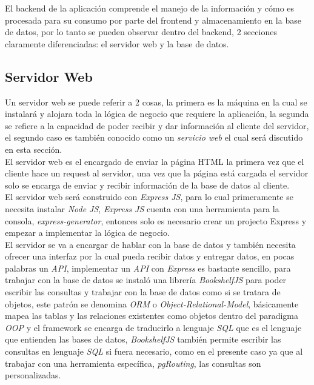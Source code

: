 


El backend de la aplicación comprende el manejo de la información y cómo es procesada para su consumo por parte del frontend y almacenamiento en la base de datos, por lo tanto se pueden observar dentro del backend, 2 secciones claramente diferenciadas: el servidor web y la base de datos.\\




\subsection{Servidor Web}
\label{sub:servidor_web}

Un servidor web se puede referir a 2 cosas, la primera es la máquina en la cual se instalará y alojara toda la lógica de negocio que requiere la aplicación, la segunda se refiere a la capacidad de poder recibir y dar información al cliente del servidor, el segundo caso es también conocido como un \emph{servicio web} el cual será discutido en esta sección.\\

El servidor web es el encargado de enviar la página HTML la primera vez que el cliente hace un request al servidor, una vez que la página está cargada el servidor solo se encarga de enviar y recibir información de la base de datos al cliente.\\

El servidor web será construido con \emph{Express JS}, para lo cual primeramente se necesita instalar \emph{Node JS}, \emph{Express JS} cuenta con una herramienta para la consola, \emph{express-generator}, entonces solo es necesario crear un projecto Express y empezar a implementar la lógica de negocio.\\

El servidor se va a encargar de hablar con la base de datos y también necesita ofrecer una interfaz por la cual pueda recibir datos y entregar datos, en pocas palabras un \emph{API}, implementar un \emph{API} con \emph{Express} es bastante sencillo, para trabajar con la base de datos se instaló una librería \emph{BookshelfJS} para poder escribir las consultas y trabajar con la base de datos como si se tratara de objetos, este patrón se denomina \emph{ORM} o \emph{Object-Relational-Model}, básicamente mapea las tablas y las relaciones existentes como objetos dentro del paradigma \emph{OOP} y el framework se encarga de traducirlo a lenguaje \emph{SQL} que es el lenguaje que entienden las bases de datos, \emph{BookshelfJS} también permite escribir las consultas en lenguaje \emph{SQL} si fuera necesario, como en el presente caso ya que al  trabajar con una herramienta específica, \emph{pgRouting}, las consultas son personalizadas.\\

